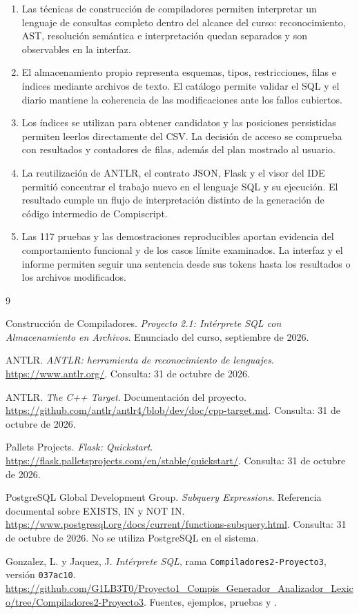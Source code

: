 \documentclass[11pt,a4paper]{article}
\begin{document}
\begin{enumerate}
  \item Las técnicas de construcción de compiladores permiten interpretar
        un lenguaje de consultas completo dentro del alcance del curso:
        reconocimiento, AST, resolución semántica e interpretación quedan
        separados y son observables en la interfaz.
  \item El almacenamiento propio representa esquemas, tipos, restricciones,
        filas e índices mediante archivos de texto. El catálogo permite
        validar el SQL y el diario mantiene la coherencia de las
        modificaciones ante los fallos cubiertos.
  \item Los índices se utilizan para obtener candidatos y las posiciones
        persistidas permiten leerlos directamente del CSV. La decisión de
        acceso se comprueba con resultados y contadores de filas, además
        del plan mostrado al usuario.
  \item La reutilización de ANTLR, el contrato JSON, Flask y el visor del
        IDE permitió concentrar el trabajo nuevo en el lenguaje SQL y su
        ejecución. El resultado cumple un flujo de interpretación distinto
        de la generación de código intermedio de Compiscript.
  \item Las 117 pruebas y las demostraciones reproducibles aportan evidencia
        del comportamiento funcional y de los casos límite examinados.
        La interfaz y el informe permiten seguir una sentencia desde sus
        tokens hasta los resultados o los archivos modificados.
\end{enumerate}

\begin{thebibliography}{9}
\raggedright
{}
Construcción de Compiladores. \emph{Proyecto 2.1: Intérprete SQL con
Almacenamiento en Archivos}. Enunciado del curso, septiembre de 2026.

ANTLR. \emph{ANTLR: herramienta de reconocimiento de lenguajes}.
\url{https://www.antlr.org/}. Consulta: 31 de octubre de 2026.

ANTLR. \emph{The C++ Target}. Documentación del proyecto.
\url{https://github.com/antlr/antlr4/blob/dev/doc/cpp-target.md}.
Consulta: 31 de octubre de 2026.

Pallets Projects. \emph{Flask: Quickstart}.
\url{https://flask.palletsprojects.com/en/stable/quickstart/}.
Consulta: 31 de octubre de 2026.

PostgreSQL Global Development Group. \emph{Subquery Expressions}.
Referencia documental sobre EXISTS, IN y NOT IN.
\url{https://www.postgresql.org/docs/current/functions-subquery.html}.
Consulta: 31 de octubre de 2026. No se utiliza PostgreSQL en el sistema.

Gonzalez, L. y Jaquez, J. \emph{Intérprete SQL}, rama
\texttt{Compiladores2-Proyecto3}, versión \texttt{037ac10}.
\url{https://github.com/G1LB3T0/Proyecto1_Compis_Generador_Analizador_Lexico/tree/Compiladores2-Proyecto3}.
Fuentes, ejemplos, pruebas y .
\end{thebibliography}
\end{document}
